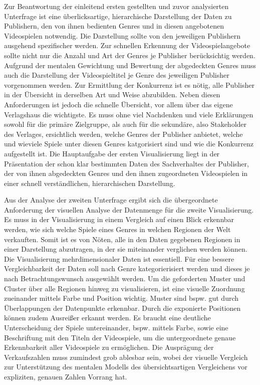 \documentclass[usegeometry=true]{scrartcl}
\begin{document}
Zur Beantwortung der einleitend ersten gestellten und zuvor analysierten Unterfrage ist eine überlicksartige, hierarchische Darstellung der Daten zu Publishern, den von ihnen bedienten Genres und in diesen angebotenen Videospielen notwendig.  
Die Darstellung sollte von den jeweiligen Publishern ausgehend spezifischer werden. 
Zur schnellen Erkennung der Videospielangebote sollte nicht nur die Anzahl und Art der Genres je Publisher berücksichtig werden. 
Aufgrund der mentalen Gewichtung und Bewertung der abgedeckten Genres muss auch die Darstellung der Videospieltitel je Genre des jeweiligen Publisher vorgenommen werden. 
Zur Ermittlung der Konkurrenz ist es nötig, alle Publisher in der Übersicht in derselben Art und Weise abzubilden. 
Neben diesen Anforderungen ist jedoch die schnelle Übersicht, vor allem über das eigene Verlagshaus die wichtigste. 
Es muss ohne viel Nachdenken und viele Erklärungen sowohl für die primäre Zielgruppe, als auch für die sekundäre, also Stakeholder des Verlages, ersichtlich werden, welche Genres der Publisher anbietet, welche und wieviele Spiele unter diesen Genres katgorisiert sind und wie die Konkurrenz aufgestellt ist.
Die Hauptaufgabe der ersten Visualisierung liegt in der Präsentation der schon klar bestimmten Daten des Sachverhaltes der Publisher, der von ihnen abgedeckten Genres und den ihnen zugeordneten Videospielen in einer schnell verständlichen, hierarchischen Darstellung.

Aus der Analyse der zweiten Unterfrage ergibt sich die übergeordnete Anforderung der visuellen Analyse der Datenmenge für die zweite Visualisierung. 
Es muss in der Visualisierung in einem Vergleich auf einen Blick erkennbar werden, wie sich welche Spiele eines Genres in welchen Regionen der Welt verkauften. 
Somit ist es von Nöten, alle in den Daten gegebenen Regionen in einer Darstellung abzutragen, in der sie miteinander verglichen werden können. 
Die Visualisierung mehrdimensionaler Daten ist essentiell.
Für eine bessere Vergleichbarkeit der Daten soll nach Genre kategorierisiert werden und dieses je nach Betrachtungswunsch ausgewählt werden.
Um die geforderten Muster und Cluster über alle Regionen hinweg zu visualisieren, ist eine visuelle Zuordnung zueinander mittels Farbe und Position wichtig. 
Muster sind bspw. gut durch Überlappungen der Datenpunkte erkennbar.
Durch die exponierte Positionen können zudem Ausreißer erkannt werden. 
Es braucht eine deutliche Unterscheidung der Spiele untereinander, bspw. mittels Farbe, sowie eine Beschriftung mit den Titeln der Videospiele, um die untergeordnete genaue Erkennbarkeit aller Videospiele zu ermöglichen.
Die Ausprägung der Verkaufszahlen muss zumindest grob ablesbar sein, wobei der visuelle Vergleich zur Unterstützung des mentalen Modells des übersichtsartigen Vergleichens vor expliziten, genauen Zahlen Vorrang hat.
\end{document}
